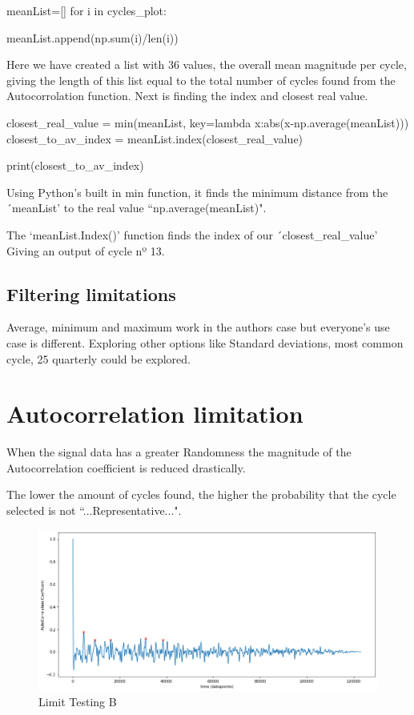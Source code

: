 \begin{python}
meanList=[]
for i in cycles_plot:

    meanList.append(np.sum(i)/len(i))
\end{python}

Here we have created a list with 36 values, the overall mean magnitude per cycle, giving the length of this list equal to the total number of cycles found from the Autocorrolation function. 
Next is finding the index and closest real value. 
\begin{python}
closest_real_value = min(meanList, key=lambda x:abs(x-np.average(meanList)))
closest_to_av_index = meanList.index(closest_real_value)

print(closest_to_av_index)
\end{python}

Using Python's built in min function, it finds the minimum distance from the ´meanList' to the real value ``np.average(meanList)". \cite{realValue}

The `meanList.Index()' function finds the index of our  ´closest\_real\_value' Giving an output of cycle nº 13.

\subsection{Filtering limitations}
Average, minimum and maximum work in the authors case but everyone's use case is different. Exploring other options like Standard deviations, most common cycle, 25 quarterly could be explored. 
\section{Autocorrelation limitation}\label{limitation}

When the signal data has a greater Randomness the magnitude of the Autocorrelation coefficient is reduced drastically. 

The lower the amount of cycles found, the higher the probability that the cycle selected is not ``...Representative...". 

\begin{figure}[ht]
\centering
\includegraphics[scale=0.40]{images/autocorrolationBadCoefficentWithPeaks.png}
\caption{Limit Testing B}
\label{LimitA}
\end{figure}

